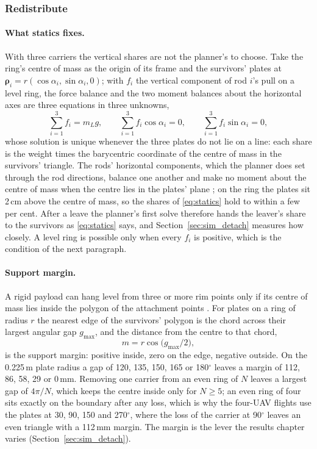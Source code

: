 \subsubsection{Redistribute}

\paragraph{What statics fixes.} With three carriers the vertical shares are not the planner's to choose. Take the
ring's centre of mass as the origin of its frame and the survivors' plates at $\boldsymbol{\rho}_i = r(\cos\alpha_i,
\sin\alpha_i, 0)$; with $f_i$ the vertical component of rod $i$'s pull on a level ring, the force balance and the
two moment balances about the horizontal axes are three equations in three unknowns,
\begin{equation}
    \sum_{i=1}^{3} f_i = m_L g, \qquad \sum_{i=1}^{3} f_i \cos\alpha_i = 0, \qquad \sum_{i=1}^{3} f_i \sin\alpha_i = 0,
    \label{eq:statics}
\end{equation}
whose solution is unique whenever the three plates do not lie on a line: each share is the weight times the
barycentric coordinate of the centre of mass in the survivors' triangle. The rods' horizontal components, which the
planner does set through the rod directions, balance one another and make no moment about the centre of mass when
the centre lies in the plates' plane \cite{michael2011cooperative, tognon2018internal}; on the
ring the plates sit 2\,cm above the centre of mass, so the shares of \eqref{eq:statics} hold to within a few per
cent. After a leave the planner's first solve therefore hands the leaver's share to the survivors as
\eqref{eq:statics} says, and Section~\ref{sec:sim_detach} measures how closely. A level ring is possible only when
every $f_i$ is positive, which is the condition of the next paragraph.

\paragraph{Support margin.} A rigid payload can hang level from three or more rim points only if its centre of mass
lies inside the polygon of the attachment points \cite{michael2011cooperative}. For plates on a ring of radius $r$
the nearest edge of the survivors' polygon is the chord across their largest angular gap $g_{\max}$, and the
distance from the centre to that chord,
\begin{equation}
    m = r \cos\!\big(g_{\max}/2\big),
    \label{eq:margin}
\end{equation}
is the support margin: positive inside, zero on the edge, negative outside. On the 0.225\,m plate radius a gap of
120, 135, 150, 165 or 180$^\circ$ leaves a margin of 112, 86, 58, 29 or 0\,mm. Removing one carrier from an even
ring of $N$ leaves a largest gap of $4\pi/N$, which keeps the centre inside only for $N \ge 5$; an even ring of
four sits exactly on the boundary after any loss, which is why the four-UAV flights use the plates at 30, 90, 150
and 270$^\circ$, where the loss of the carrier at 90$^\circ$ leaves an even triangle with a 112\,mm margin. The
margin is the lever the results chapter varies (Section~\ref{sec:sim_detach}).

